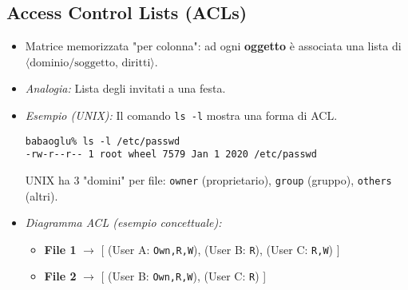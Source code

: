 \documentclass{article}
\begin{document}
\subsection{Access Control Lists (ACLs)}
\begin{itemize}
    \item Matrice memorizzata "per colonna": ad ogni \textbf{oggetto} è associata una lista di $\langle \text{dominio/soggetto, diritti} \rangle$.
    \item \textit{Analogia:} Lista degli invitati a una festa.
    \item \textit{Esempio (UNIX):} Il comando \texttt{ls -l} mostra una forma di ACL.
    \begin{verbatim}
babaoglu% ls -l /etc/passwd
-rw-r--r-- 1 root wheel 7579 Jan 1 2020 /etc/passwd
    \end{verbatim}
    UNIX ha 3 "domini" per file: \texttt{owner} (proprietario), \texttt{group} (gruppo), \texttt{others} (altri).
    \item \textit{Diagramma ACL (esempio concettuale):}
    \begin{itemize}
        \item \textbf{File 1} $\rightarrow$ [ (User A: \texttt{Own,R,W}), (User B: \texttt{R}), (User C: \texttt{R,W}) ]
        \item \textbf{File 2} $\rightarrow$ [ (User B: \texttt{Own,R,W}), (User C: \texttt{R}) ]
    \end{itemize}
\end{itemize}
\end{document}
